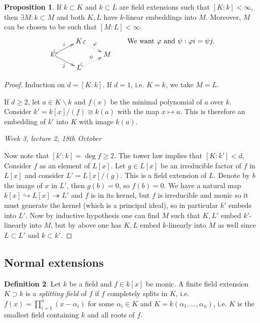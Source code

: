 \documentclass{article}
\theoremstyle{definition}
\newtheorem{defn}{Definition}[subsection]
\newtheorem{prop}[defn]{Proposition}
\begin{document}
\begin{prop}
\label{prop:kKLM}
If $k\subset K$ and $k\subset L$ are field extensions such that $[K:k]<\infty$, then $\exists M:k\subset M$ and both $K,L$ have $k$-linear embeddings into $M$. Moreover, $M$ can be chosen to be such that $[M:L]<\infty$.
\[
\xymatrix@R=0.5pc{
& K\ar@{^{(}.>}[dr]^\varphi \\
k\ar@{^{(}->}[ur]^i \ar@{^{(}->}[dr]_j & & M \\
& L\ar@{^{(}.>}[ur]^\psi
}
\qquad
\text{We want }\varphi\text{ and }\psi:\varphi i=\psi j.
\]
\end{prop}
\begin{proof}
Induction on $d=[K:k]$. If $d=1$, i.e. $K=k$, we take $M=L$.

If $d\geq 2$, let $a\in K\backslash k$ and $f(x)$ be the minimal polynomial of $a$ over $k$. Consider $k'=k[x]/(f)\cong k(a)$ with the map $x\mapsto a$. This is therefore an embedding of $k'$ into $K$ with image $k(a)$.

\begin{flushright}
\textit{Week 3, lecture 2, 18th October}
\end{flushright}

Now note that $[k':k]=\deg f\geq 2$. The tower law implies that $[K:k']<d$, Consider $f$ as an element of $L[x]$. Let $g\in L[x]$ be an irreducible factor of $f$ in $L[x]$ and consider $L'=L[x]/(g)$. This is a field extension of $L$. Denote by $b$ the image of $x$ in $L'$, then $g(b)=0$, so $f(b)=0$. We have a natural map $k[x]\hookrightarrow L[x]\twoheadrightarrow L'$ and $f$ is in its kernel, but $f$ is irreducible and monic so it must generate the kernel (which is a principal ideal), so in particular $k'$ embeds into $L'$. Now by inductive hypothesis one can find $M$ such that $K,L'$ embed $k'$-linearly into $M$, but by above one has $K,L$ embed $k$-linearly into $M$ as well since $L\subset L'$ and $k\subset k'$.
\end{proof}

\subsection{Normal extensions}
\begin{defn}
Let $k$ be a field and $f\in k[x]$ be monic. A finite field extension $K\supset k$ is a \textit{splitting field} of $f$ if $f$ completely splits in $K$, i.e. $f(x)=\prod_{i=1}^n(x-\alpha_i)$ for some $\alpha_i\in K$ and $K=k(\alpha_1,\ldots,\alpha_n)$, i.e. $K$ is the smallest field containing $k$ and all roots of $f$.
\end{defn}
\end{document}
